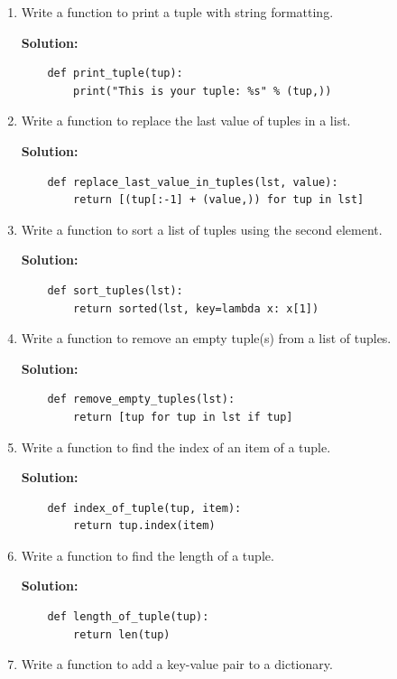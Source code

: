 \documentclass[12pt]{book}
\begin{document}
\begin{enumerate}
    \item  Write a function to print a tuple with string formatting.

    \textbf{Solution:}
    \begin{lstlisting}
    def print_tuple(tup):
        print("This is your tuple: %s" % (tup,))
    \end{lstlisting}

    \item  Write a function to replace the last value of tuples in a list.

    \textbf{Solution:}
    \begin{lstlisting}
    def replace_last_value_in_tuples(lst, value):
        return [(tup[:-1] + (value,)) for tup in lst]
    \end{lstlisting}

    \item  Write a function to sort a list of tuples using the second element.

    \textbf{Solution:}
    \begin{lstlisting}
    def sort_tuples(lst):
        return sorted(lst, key=lambda x: x[1])
    \end{lstlisting}

    \item  Write a function to remove an empty tuple(s) from a list of tuples.

    \textbf{Solution:}
    \begin{lstlisting}
    def remove_empty_tuples(lst):
        return [tup for tup in lst if tup]
    \end{lstlisting}

    \item  Write a function to find the index of an item of a tuple.

    \textbf{Solution:}
    \begin{lstlisting}
    def index_of_tuple(tup, item):
        return tup.index(item)
    \end{lstlisting}

    \item Write a function to find the length of a tuple.

    \textbf{Solution:}
    \begin{lstlisting}
    def length_of_tuple(tup):
        return len(tup)
    \end{lstlisting}
    
    \item  Write a function to add a key-value pair to a dictionary.


\end{enumerate}
\end{document}

